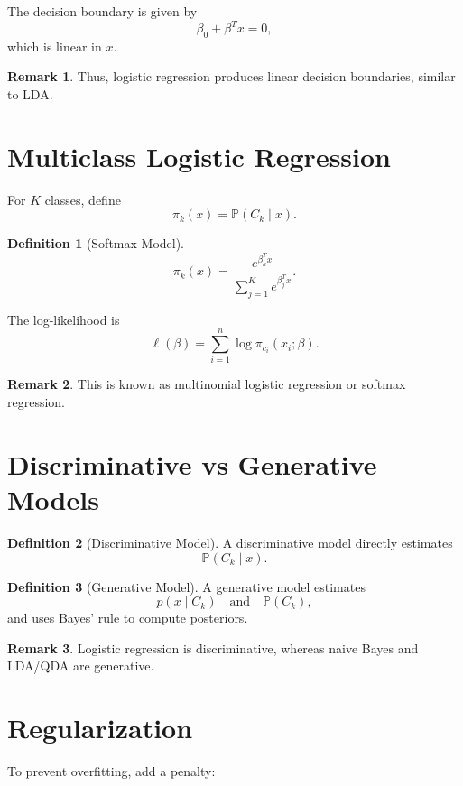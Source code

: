 \documentclass[12pt,oneside]{book}
\numberwithin{equation}{section}
\theoremstyle{definition}
\newtheorem{definition}{Definition}[section]
\newtheorem{remark}{Remark}[section]
\theoremstyle{plain}
\theoremstyle{remark}
\newcommand{\Prob}{\mathbb{P}}
\begin{document}
The decision boundary is given by
\[
\beta_0 + \beta^T x = 0,
\]
which is linear in $x$.

\begin{remark}
Thus, logistic regression produces linear decision boundaries, similar to LDA.
\end{remark}

\section{Multiclass Logistic Regression}

For $K$ classes, define
\[
\pi_k(x)
=
\Prob(C_k \mid x).
\]

\begin{definition}[Softmax Model]
\[
\pi_k(x)
=
\frac{e^{\beta_k^T x}}{\sum_{j=1}^K e^{\beta_j^T x}}.
\]
\end{definition}

The log-likelihood is
\[
\ell(\beta)
=
\sum_{i=1}^n
\log \pi_{c_i}(x_i;\beta).
\]

\begin{remark}
This is known as multinomial logistic regression or softmax regression.
\end{remark}

\section{Discriminative vs Generative Models}

\begin{definition}[Discriminative Model]
A discriminative model directly estimates
\[
\Prob(C_k \mid x).
\]
\end{definition}

\begin{definition}[Generative Model]
A generative model estimates
\[
p(x \mid C_k)
\quad \text{and} \quad \Prob(C_k),
\]
and uses Bayes' rule to compute posteriors.
\end{definition}

\begin{remark}
Logistic regression is discriminative, whereas naive Bayes and LDA/QDA are generative.
\end{remark}

\section{Regularization}

To prevent overfitting, add a penalty:
\end{document}
